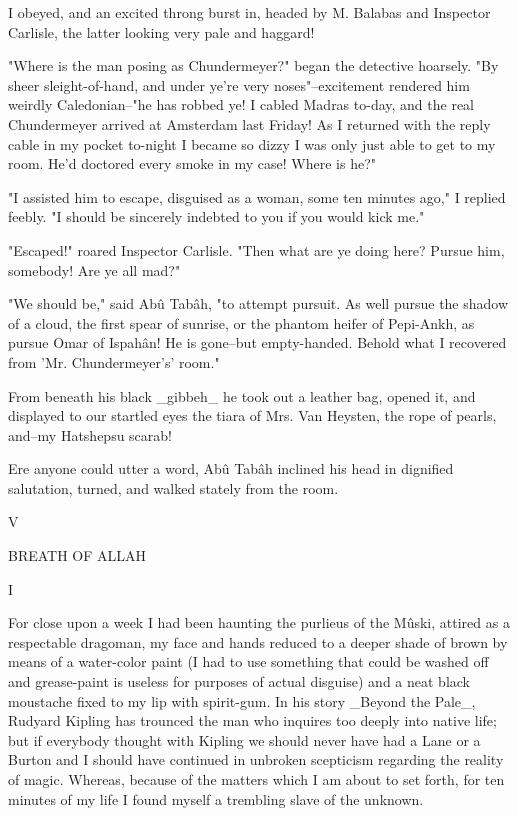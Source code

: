 I obeyed, and an excited throng burst in, headed by M. Balabas and
Inspector Carlisle, the latter looking very pale and haggard!

"Where is the man posing as Chundermeyer?" began the detective
hoarsely. "By sheer sleight-of-hand, and under ye're very
noses"--excitement rendered him weirdly Caledonian--"he has robbed
ye! I cabled Madras to-day, and the real Chundermeyer arrived at
Amsterdam last Friday! As I returned with the reply cable in my pocket
to-night I became so dizzy I was only just able to get to my room.
He'd doctored every smoke in my case! Where is he?"

"I assisted him to escape, disguised as a woman, some ten minutes
ago," I replied feebly. "I should be sincerely indebted to you if
you would kick me."

"Escaped!" roared Inspector Carlisle. "Then what are ye doing here?
Pursue him, somebody! Are ye all mad?"

"We should be," said Abû Tabâh, "to attempt pursuit. As well pursue
the shadow of a cloud, the first spear of sunrise, or the phantom
heifer of Pepi-Ankh, as pursue Omar of Ispahân! He is gone--but
empty-handed. Behold what I recovered from 'Mr. Chundermeyer's' room."

From beneath his black _gibbeh_ he took out a leather bag, opened it,
and displayed to our startled eyes the tiara of Mrs. Van Heysten, the
rope of pearls, and--my Hatshepsu scarab!

Ere anyone could utter a word, Abû Tabâh inclined his head in
dignified salutation, turned, and walked stately from the room.




V

BREATH OF ALLAH


I

For close upon a week I had been haunting the purlieus of the Mûski,
attired as a respectable dragoman, my face and hands reduced to a
deeper shade of brown by means of a water-color paint (I had to use
something that could be washed off and grease-paint is useless for
purposes of actual disguise) and a neat black moustache fixed to my
lip with spirit-gum. In his story _Beyond the Pale_, Rudyard Kipling
has trounced the man who inquires too deeply into native life; but if
everybody thought with Kipling we should never have had a Lane or a
Burton and I should have continued in unbroken scepticism regarding
the reality of magic. Whereas, because of the matters which I am about
to set forth, for ten minutes of my life I found myself a trembling
slave of the unknown.

